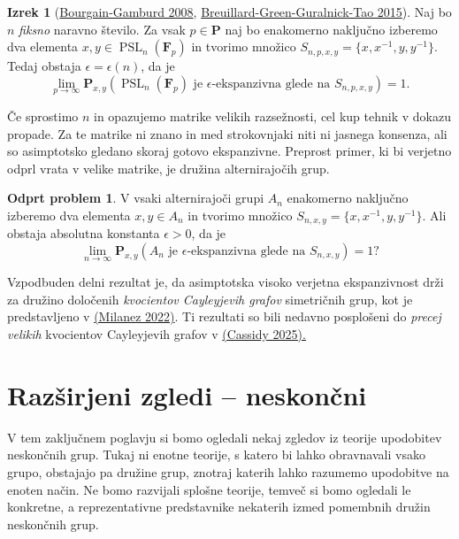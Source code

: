 \documentclass[11pt]{book}
\def\FF{\mathbf{F}}
\def\PP{\mathbf{P}}
\DeclareMathOperator\PSL{PSL}
\theoremstyle{definition}
\theoremstyle{zgled}
\theoremstyle{zgledbrezstevilke}
\theoremstyle{odprtproblem}
\newtheorem{odprtproblem}[theorem]{Odprt problem}
\theoremstyle{domacanaloga}
\theoremstyle{izrek}
\newtheorem{izrek}[theorem]{Izrek}
\begin{document}
\begin{izrek}[\href{https://annals.math.princeton.edu/2008/167-2/p07}{Bourgain-Gamburd 2008}, \href{https://ems.press/journals/jems/articles/12498}{Breuillard-Green-Guralnick-Tao 2015}]
Naj bo $n$ \emph{fiksno} naravno število. Za vsak $p \in \PP$ naj bo enakomerno naključno izberemo dva elementa $x,y \in \PSL_n(\FF_p)$ in tvorimo množico $S_{n,p,x,y} = \{ x, x^{-1}, y, y^{-1} \}$. Tedaj obstaja $\epsilon = \epsilon(n)$, da je 
\[
    \lim_{p \to \infty} \PP_{x,y}(\textstyle \text{$\PSL_n(\FF_p)$ je $\epsilon$-ekspanzivna glede na $S_{n,p,x,y}$}) = 1.
\]
\end{izrek}

Če sprostimo $n$ in opazujemo matrike velikih razsežnosti, cel kup tehnik v dokazu propade. Za te matrike ni znano in med strokovnjaki niti ni jasnega konsenza, ali so asimptotsko gledano skoraj gotovo ekspanzivne. Preprost primer, ki bi verjetno odprl vrata v velike matrike, je družina alternirajočih grup.

\begin{odprtproblem}
V vsaki alternirajoči grupi $A_n$ enakomerno naključno izberemo dva elementa $x,y \in A_n$ in tvorimo množico $S_{n,x,y} = \{ x, x^{-1}, y, y^{-1} \}$. Ali obstaja absolutna konstanta $\epsilon > 0$, da je
\[
    \lim_{n \to \infty} \PP_{x,y}(\text{$A_n$ je $\epsilon$-ekspanzivna glede na $S_{n,x,y}$}) = 1 ?
\]
\end{odprtproblem}

Vzpodbuden delni rezultat je, da asimptotska visoko verjetna ekspanzivnost drži za družino določenih \emph{kvocientov Cayleyjevih grafov} simetričnih grup, kot je predstavljeno v \href{https://repozitorij.uni-lj.si/IzpisGradiva.php?id=140303}{(Milanez 2022)}. Ti rezultati so bili nedavno posplošeni do \emph{precej velikih} kvocientov Cayleyjevih grafov v \href{https://arxiv.org/abs/2412.13941}{(Cassidy 2025).}

\chapter{Razširjeni zgledi -- neskončni}

V tem zaključnem poglavju si bomo ogledali nekaj zgledov iz teorije upodobitev neskončnih grup. Tukaj ni enotne teorije, s katero bi lahko obravnavali vsako grupo, obstajajo pa družine grup, znotraj katerih lahko razumemo upodobitve na enoten način. Ne bomo razvijali splošne teorije, temveč si bomo ogledali le konkretne, a reprezentativne predstavnike nekaterih izmed pomembnih družin neskončnih grup.
\end{document}
